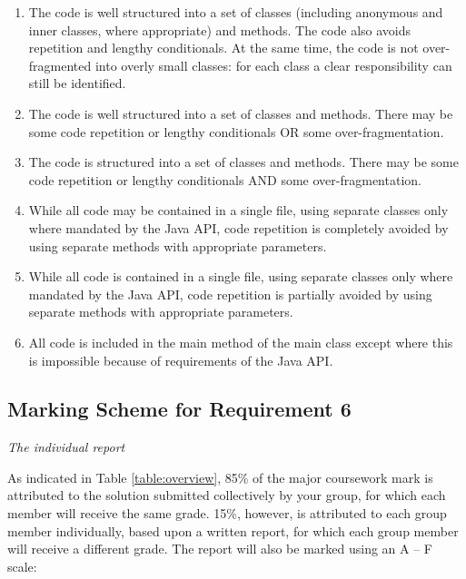 \documentclass[11pt]{article}
\begin{document}
\begin{enumerate}[label=(\Alph*)]

	\item The code is well structured into a set of classes (including anonymous and inner classes, where appropriate)  and methods. The code also avoids repetition and lengthy conditionals. At the same time, the code is not over-fragmented into overly small classes: for each class a clear responsibility can still be identified.

	\item The code is well structured into a set of classes and methods. There may be some code repetition or lengthy conditionals OR some over-fragmentation.

	\item The code is structured into a set of classes and methods. There may be some code repetition or lengthy conditionals AND some over-fragmentation.

	\item While all code may be contained in a single file, using separate classes only where mandated by the Java API, code repetition is completely avoided by using separate methods with appropriate parameters.

	\item While all code is contained in a single file, using separate classes only where mandated by the Java API, code repetition is partially avoided by using separate methods with appropriate parameters.

	\item All code is included in the main method of the main class except where this is impossible because of requirements of the Java API.

\end{enumerate}

\subsection{Marking Scheme for Requirement 6}

\emph{The individual report}

As indicated in Table \ref{table:overview}, 85\% of the major coursework mark is attributed to the solution submitted collectively by your group, for which each member will receive the same grade. 15\%, however, is attributed to each group member individually, based upon a written report, for which each group member will receive a different grade. The report will also be marked using an A -- F scale:
\end{document}
